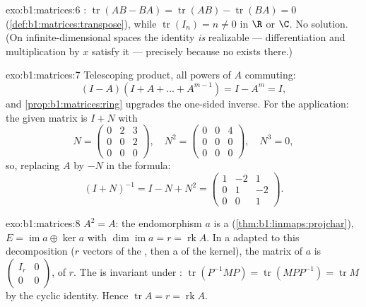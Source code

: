 \begin{solution}{exo:b1:matrices:6}
: $\operatorname{tr}(AB - BA) = \operatorname{tr}(AB) -
\operatorname{tr}(BA) = 0$ (\cref{def:b1:matrices:transpose}),
while $\operatorname{tr}(I_n) = n \neq 0$ in $\R$ or $\C$. No
solution. (On infinite-dimensional spaces the identity \emph{is}
realizable --- differentiation and multiplication by $x$ satisfy it
--- precisely because no  exists there.)
\end{solution}

\begin{solution}{exo:b1:matrices:7}
Telescoping product, all powers of $A$ commuting:
\[
(I - A)(I + A + \dots + A^{m-1}) = I - A^m = I ,
\]
and \cref{prop:b1:matrices:ring} upgrades the one-sided inverse. For
the application: the given matrix is $I + N$ with
\[
N = \begin{pmatrix} 0 & 2 & 3\\ 0 & 0 & 2\\ 0&0&0 \end{pmatrix},
\quad
N^2 = \begin{pmatrix} 0&0&4\\ 0&0&0\\ 0&0&0\end{pmatrix},
\quad N^3 = 0 ,
\]
so, replacing $A$ by $-N$ in the formula:
\[
(I + N)^{-1} = I - N + N^2 =
\begin{pmatrix}
1 & -2 & 1\\
0 & 1 & -2\\
0 & 0 & 1
\end{pmatrix}.
\]
\end{solution}

\begin{solution}{exo:b1:matrices:8}
$A^2 = A$: the endomorphism $a$ is a 
(\cref{thm:b1:linmaps:projchar}), $E = \operatorname{im} a \oplus
\ker a$ with $\dim\operatorname{im} a = r = \operatorname{rk} A$. In
a  adapted to this decomposition ($r$ vectors of the ,
then a  of the kernel), the matrix of $a$ is
$\begin{pmatrix} I_r & 0\\ 0 & 0\end{pmatrix}$, of  $r$. The
 is invariant under :
$\operatorname{tr}(P^{-1}MP) = \operatorname{tr}(MPP^{-1}) =
\operatorname{tr} M$ by the cyclic identity. Hence
$\operatorname{tr} A = r = \operatorname{rk} A$.
\end{solution}

